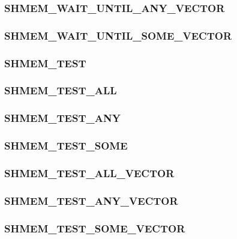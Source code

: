 \documentclass[10pt,oneside]{book}
\begin{document}
\subsubsection{\textbf{SHMEM\_WAIT\_UNTIL\_ANY\_VECTOR}}\label{subsec:shmem_wait_until_any_vector}


\subsubsection{\textbf{SHMEM\_WAIT\_UNTIL\_SOME\_VECTOR}}\label{subsec:shmem_wait_until_some_vector}


\subsubsection{\textbf{SHMEM\_TEST}}\label{subsec:shmem_test}


\subsubsection{\textbf{SHMEM\_TEST\_ALL}}\label{subsec:shmem_test_all}


\subsubsection{\textbf{SHMEM\_TEST\_ANY}}\label{subsec:shmem_test_any}


\subsubsection{\textbf{SHMEM\_TEST\_SOME}}\label{subsec:shmem_test_some}


\subsubsection{\textbf{SHMEM\_TEST\_ALL\_VECTOR}}\label{subsec:shmem_test_all_vector}


\subsubsection{\textbf{SHMEM\_TEST\_ANY\_VECTOR}}\label{subsec:shmem_test_any_vector}


\subsubsection{\textbf{SHMEM\_TEST\_SOME\_VECTOR}}\label{subsec:shmem_test_some_vector}

\end{document}
